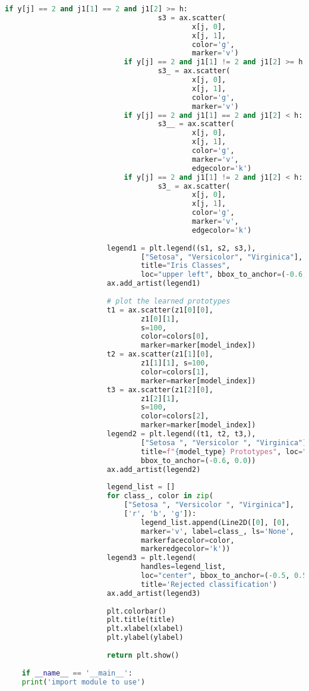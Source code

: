 \documentclass[english]{HSMW-Thesis}
\begin{document}
\begin{lstlisting}[caption = contour.py, style=chstyle, language=Python]
							if y[j] == 2 and j1[1] == 2 and j1[2] >= h:
									s3 = ax.scatter(
											x[j, 0],
											x[j, 1], 
											color='g', 
											marker='v')
							if y[j] == 2 and j1[1] != 2 and j1[2] >= h:
									s3_ = ax.scatter(
											x[j, 0], 
											x[j, 1], 
											color='g', 
											marker='v')
							if y[j] == 2 and j1[1] == 2 and j1[2] < h:
									s3__ = ax.scatter(
											x[j, 0], 
											x[j, 1], 
											color='g', 
											marker='v', 
											edgecolor='k')
							if y[j] == 2 and j1[1] != 2 and j1[2] < h:
									s3_ = ax.scatter(
											x[j, 0], 
											x[j, 1], 
											color='g', 
											marker='v', 
											edgecolor='k')
	
						legend1 = plt.legend((s1, s2, s3,),
								["Setosa", "Versicolor", "Virginica"],
								title="Iris Classes",
								loc="upper left", bbox_to_anchor=(-0.6, 1))
						ax.add_artist(legend1)
						
						# plot the learned prototypes
						t1 = ax.scatter(z1[0][0], 
								z1[0][1], 
								s=100, 
								color=colors[0], 
								marker=marker[model_index])
						t2 = ax.scatter(z1[1][0], 
								z1[1][1], s=100, 
								color=colors[1], 
								marker=marker[model_index])
						t3 = ax.scatter(z1[2][0], 
								z1[2][1], 
								s=100, 
								color=colors[2], 
								marker=marker[model_index])
						legend2 = plt.legend((t1, t2, t3,),
								["Setosa ", "Versicolor ", "Virginica"],
								title=f"{model_type} Prototypes", loc="lower left",
								bbox_to_anchor=(-0.6, 0.0))
						ax.add_artist(legend2)
	
						legend_list = []
						for class_, color in zip(
							["Setosa ", "Versicolor ", "Virginica"], 
							['r', 'b', 'g']):
								legend_list.append(Line2D([0], [0],
								marker='v', label=class_, ls='None',
								markerfacecolor=color,
								markeredgecolor='k'))
						legend3 = plt.legend(
								handles=legend_list,
								loc="center", bbox_to_anchor=(-0.5, 0.5),
								title='Rejected classification')
						ax.add_artist(legend3)
	
						plt.colorbar()
						plt.title(title)
						plt.xlabel(xlabel)
						plt.ylabel(ylabel)
						
						return plt.show()
						
	if __name__ == '__main__':
	print('import module to use')
	
\end{lstlisting}

\begin{comment}
	
\end{comment}
\end{document}

